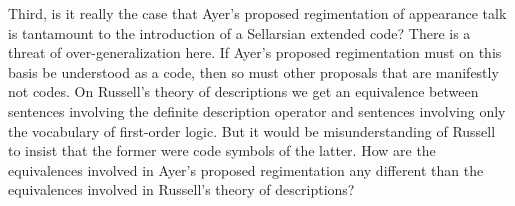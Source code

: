 \documentclass[11pt]{article}
\begin{document}
Third, is it really the case that Ayer's proposed regimentation of appearance talk is tantamount to the introduction of a Sellarsian extended code? There is a threat of over-generalization here. If Ayer's proposed regimentation must on this basis be understood as a code, then so must other proposals that are manifestly not codes. On Russell's theory of descriptions we get an equivalence between sentences involving the definite description operator and sentences involving only the vocabulary of first-order logic. But it would be misunderstanding of Russell to insist that the former were code symbols of the latter. How are the equivalences involved in Ayer's proposed regimentation any different than the equivalences involved in Russell's theory of descriptions?

\end{document}
